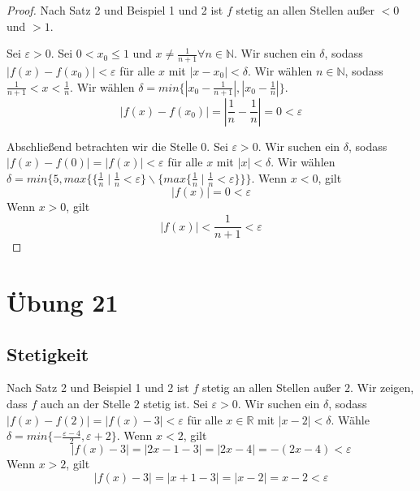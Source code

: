 \documentclass[a4paper,10pt]{article}
\begin{document}
\begin{proof}
 Nach Satz 2 und Beispiel 1 und 2 ist $f$ stetig an allen Stellen außer $< 0$ und $> 1$.
 
 Sei $\varepsilon > 0$.
 Sei $0 < x_0 \le 1$ und $x \ne \frac{1}{n + 1} \forall n \in \mathbb{N}$.
 Wir suchen ein $\delta$, sodass $|f(x) - f(x_0)| < \varepsilon$ für alle $x$ mit $|x - x_0| < \delta$.
 Wir wählen $n \in \mathbb{N}$, sodass $\frac{1}{n + 1} < x < \frac{1}{n}$.
 Wir wählen $\delta = min \{ |x_0 - \frac{1}{n + 1}|, |x_0 - \frac{1}{n}| \}$.
 \begin{equation}
  |f(x) - f(x_0)| = |\frac{1}{n} - \frac{1}{n}| = 0 < \varepsilon
 \end{equation}
 
 Abschließend betrachten wir die Stelle $0$.
 Sei $\varepsilon > 0$.
 Wir suchen ein $\delta$, sodass $|f(x) - f(0)| = |f(x)| < \varepsilon$ für alle $x$ mit $|x| < \delta$.
 Wir wählen $\delta = min \{5, max \{ \{ \frac{1}{n} \mid \frac{1}{n} < \varepsilon \} \backslash \{ max \{ \frac{1}{n} \mid \frac{1}{n} < \varepsilon \} \} \}$.
 Wenn $x < 0$, gilt
 \begin{equation}
  |f(x)| = 0 < \varepsilon
 \end{equation}
 Wenn $x > 0$, gilt
 \begin{equation}
  |f(x)| < \frac{1}{n + 1} < \varepsilon
 \end{equation}
\end{proof}

\section*{Übung 21}

\subsection*{Stetigkeit}

Nach Satz 2 und Beispiel 1 und 2 ist $f$ stetig an allen Stellen außer $2$.
Wir zeigen, dass $f$ auch an der Stelle $2$ stetig ist.
Sei $\varepsilon > 0$.
Wir suchen ein $\delta$, sodass $|f(x) - f(2)| = |f(x) - 3| < \varepsilon$ für alle $x \in \mathbb{R}$ mit $|x - 2| < \delta$.
Wähle $\delta = min \{ -\frac{\varepsilon - 4}{2}, \varepsilon + 2 \}$.
Wenn $x < 2$, gilt
\begin{equation}
 |f(x) - 3| = |2x - 1 - 3| = |2x - 4| = -(2x - 4) < \varepsilon
\end{equation}
Wenn $x > 2$, gilt
\begin{equation}
 |f(x) - 3| = |x + 1 - 3| = |x - 2| = x - 2 < \varepsilon
\end{equation}
\end{document}
